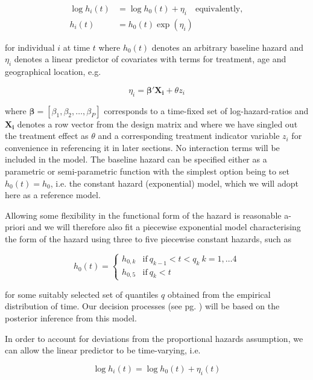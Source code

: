 \documentclass[a4paper]{article}
\begin{document}
\begin{align*}
\log h_i(t) &= \log h_0(t) + \eta_i \quad \text{equivalently},  \\
h_i(t) &= h_0(t) \exp(\eta_i)
\end{align*}

for individual $i$ at time $t$ where $h_0(t)$ denotes an arbitrary baseline hazard and $\eta_i$ denotes a linear predictor of covariates with terms for treatment, age and geographical location, e.g.

\begin{equation}
\eta_i = \boldsymbol{\beta}' \boldsymbol{X_i} + \theta z_i
\end{equation}

where $\boldsymbol{\beta} = [\beta_1, \beta_2, \dots, \beta_P]$ corresponds to a time-fixed set of log-hazard-ratios and $\boldsymbol{X_i}$ denotes a row vector from the design matrix and where we have singled out the treatment effect as $\theta$ and a corresponding treatment indicator variable $z_i$ for convenience in referencing it in later sections.
No interaction terms will be included in the model.
The baseline hazard can be specified either as a parametric or semi-parametric function with the simplest option being to set $h_0(t) = h_0$, i.e. the constant hazard (exponential) model, which we will adopt here as a reference model.

Allowing some flexibility in the functional form of the hazard is reasonable a-priori and we will therefore also fit a piecewise exponential model characterising the form of the hazard using three to five piecewise constant hazards, such as

\begin{equation}
h_0(t) = \begin{cases}
      h_{0,k} & \text{if}\ q_{k-1} < t < q_k \ k = 1, \dots 4 \\
      h_{0,5} & \text{if}\ q_k < t
    \end{cases}
\end{equation}

for some suitably selected set of quantiles $q$ obtained from the empirical distribution of time.
Our decision processes (see pg. \pageref{trial-adaptations-and-decision-procedures}) will be based on the posterior inference from this model.

In order to account for deviations from the proportional hazards assumption, we can allow the linear predictor to be time-varying, i.e. 

\begin{equation}
\log h_i(t) = \log h_0(t) + \eta_i(t)
\end{equation}
\end{document}
